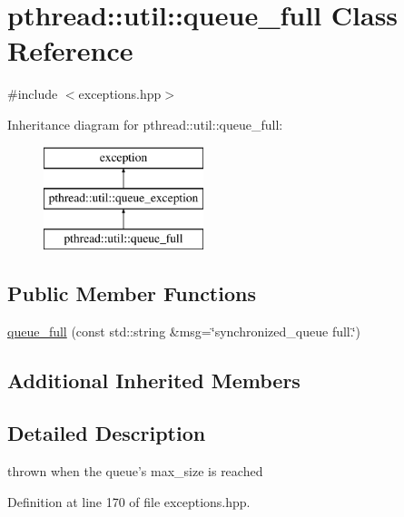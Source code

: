 \hypertarget{classpthread_1_1util_1_1queue__full}{\section{pthread\+:\+:util\+:\+:queue\+\_\+full Class Reference}
\label{classpthread_1_1util_1_1queue__full}
}


{\ttfamily \#include $<$exceptions.\+hpp$>$}

Inheritance diagram for pthread\+:\+:util\+:\+:queue\+\_\+full\+:\begin{figure}[H]
\begin{center}
\leavevmode
\includegraphics[height=3.000000cm]{classpthread_1_1util_1_1queue__full}
\end{center}
\end{figure}
\subsection*{Public Member Functions}
\begin{DoxyCompactItemize}
\item 
\hyperlink{classpthread_1_1util_1_1queue__full_a5cc7fc322cb982ba871b9c92724b20c3}{queue\+\_\+full} (const std\+::string \&msg=\char`\"{}synchronized\+\_\+queue full.\char`\"{})
\end{DoxyCompactItemize}
\subsection*{Additional Inherited Members}


\subsection{Detailed Description}
thrown when the queue's max\+\_\+size is reached 

Definition at line 170 of file exceptions.\+hpp.



